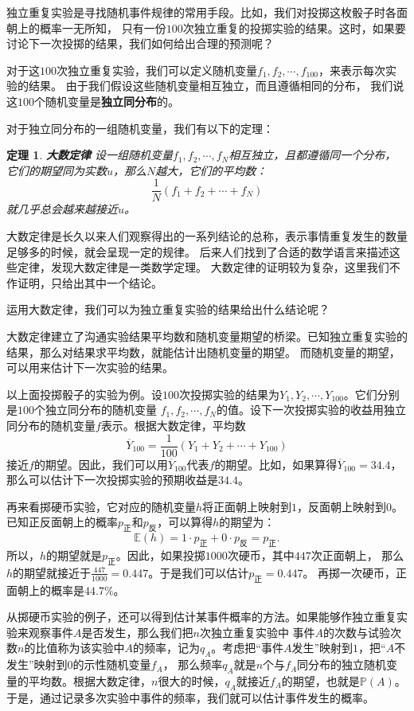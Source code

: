 \documentclass[12pt,UTF8]{ctexbook}
\newtheorem{tm}{定理}[section]
\begin{document}
独立重复实验是寻找随机事件规律的常用手段。比如，我们对投掷这枚骰子时各面朝上的概率一无所知，
只有一份$100$次独立重复的投掷实验的结果。这时，如果要讨论下一次投掷的结果，我们如何给出合理的预测呢？

对于这$100$次独立重复实验，我们可以定义随机变量$f_1,f_2,\cdots , f_{100}$，来表示每次实验的结果。
由于我们假设这些随机变量相互独立，而且遵循相同的分布，
我们说这$100$个随机变量是\textbf{独立同分布}的。

对于独立同分布的一组随机变量，我们有以下的定理：
\begin{tm}\textbf{大数定律}
    设一组随机变量$f_1, f_2, \cdots, f_{N}$相互独立，且都遵循同一个分布，
    它们的期望同为实数$u$，那么$N$越大，它们的平均数：
    $$\frac{1}{N}\left(f_1 + f_2 + \cdots + f_{N}\right)$$
    就几乎总会越来越接近$u$。
\end{tm}

大数定律是长久以来人们观察得出的一系列结论的总称，表示事情重复发生的数量足够多的时候，就会呈现一定的规律。
后来人们找到了合适的数学语言来描述这些定律，发现大数定律是一类数学定理。
大数定律的证明较为复杂，这里我们不作证明，只给出其中一个结论。

运用大数定律，我们可以为独立重复实验的结果给出什么结论呢？

大数定律建立了沟通实验结果平均数和随机变量期望的桥梁。已知独立重复实验的结果，那么对结果求平均数，就能估计出随机变量的期望。
而随机变量的期望，可以用来估计下一次实验的结果。

以上面投掷骰子的实验为例。设$100$次投掷实验的结果为$Y_1, Y_2, \cdots , Y_{100}$。它们分别是$100$个独立同分布的随机变量
$f_1, f_2, \cdots, f_{N}$的值。设下一次投掷实验的收益用独立同分布的随机变量$f$表示。根据大数定律，平均数
$$\overline{Y}_{100} = \frac{1}{100}(Y_1 + Y_2 + \cdots + Y_{100})$$
接近$f$的期望。因此，我们可以用$\overline{Y}_{100}$代表$f$的期望。比如，如果算得$\overline{Y}_{100} = 34.4$，
那么可以估计下一次投掷实验的预期收益是$34.4$。

再来看掷硬币实验，它对应的随机变量$h$将正面朝上映射到$1$，反面朝上映射到$0$。
已知正反面朝上的概率$p_{\text{正}}$和$p_{\text{反}}$，可以算得$h$的期望为：
$$ \mathbb{E}(h) = 1 \cdot p_{\text{正}} + 0 \cdot p_{\text{反}} = p_{\text{正}}.$$
所以，$h$的期望就是$p_{\text{正}}$。因此，如果投掷$1000$次硬币，其中$447$次正面朝上，
那么$h$的期望就接近于$\frac{447}{1000} = 0.447$。于是我们可以估计$p_{\text{正}} = 0.447$。
再掷一次硬币，正面朝上的概率是$44.7\%$。

从掷硬币实验的例子，还可以得到估计某事件概率的方法。如果能够作独立重复实验来观察事件$A$是否发生，那么我们把$n$次独立重复实验中
事件$A$的次数与试验次数$n$的比值称为该实验中$A$的频率，记为$q_A$。考虑把“事件$A$发生”映射到$1$，把“$A$不发生”映射到$0$的示性随机变量$f_A$，
那么频率$q_A$就是$n$个与$f_A$同分布的独立随机变量的平均数。根据大数定律，$n$很大的时候，$q_A$就接近$f_A$的期望，也就是$\mathbb{P}(A)$。
于是，通过记录多次实验中事件的频率，我们就可以估计事件发生的概率。
\end{document}
